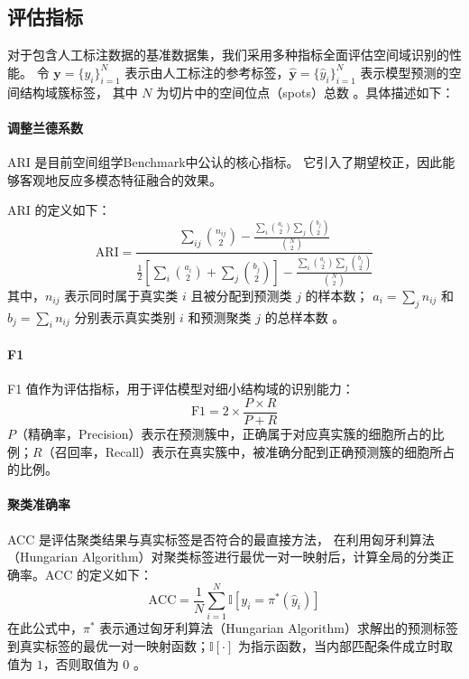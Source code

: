 \documentclass[journal]{IEEEtran}
\begin{document}
\subsection{评估指标}
对于包含人工标注数据的基准数据集，我们采用多种指标全面评估空间域识别的性能。
令 $\mathbf{y}=\{y_i\}_{i=1}^{N}$ 表示由人工标注的参考标签，$\hat{\mathbf{y}}=\{\hat{y}_i\}_{i=1}^{N}$ 表示模型预测的空间结构域簇标签，
其中 $N$ 为切片中的空间位点（spots）总数 。具体描述如下：

\paragraph{调整兰德系数}
ARI 是目前空间组学Benchmark中公认的核心指标。
它引入了期望校正，因此能够客观地反应多模态特征融合的效果。

ARI 的定义如下：
\begin{equation}
\mathrm{ARI}=\frac{\sum_{ij}\binom{n_{ij}}{2}-\frac{\sum_i\binom{a_i}{2}\sum_j\binom{b_j}{2}}{\binom{N}{2}}}{\frac{1}{2}\left[\sum_i\binom{a_i}{2}+\sum_j\binom{b_j}{2}\right]-\frac{\sum_i\binom{a_i}{2}\sum_j\binom{b_j}{2}}{\binom{N}{2}}}
\end{equation}
其中，$n_{ij}$ 表示同时属于真实类 $i$ 且被分配到预测类 $j$ 的样本数；
$a_i = \sum_j n_{ij}$ 和 $b_j = \sum_i n_{ij}$ 分别表示真实类别 $i$ 和预测聚类 $j$ 的总样本数 。

\paragraph{F1}
F1 值作为评估指标，用于评估模型对细小结构域的识别能力：
\begin{equation}
\mathrm{F1}=2\times \frac{P\times R}{P+R}
\end{equation}
$P$（精确率，Precision）表示在预测簇中，正确属于对应真实簇的细胞所占的比例；$R$（召回率，Recall）表示在真实簇中，被准确分配到正确预测簇的细胞所占的比例。
\paragraph{聚类准确率}
ACC 是评估聚类结果与真实标签是否符合的最直接方法，
在利用匈牙利算法（Hungarian Algorithm）对聚类标签进行最优一对一映射后，计算全局的分类正确率。ACC 的定义如下：
\begin{equation}
\mathrm{ACC}=\frac{1}{N}\sum_{i=1}^{N}\mathbb{I}\left[y_i=\pi^{*}(\hat{y}_i)\right]
\end{equation}
在此公式中，$\pi^{*}$ 表示通过匈牙利算法（Hungarian Algorithm）求解出的预测标签到真实标签的最优一对一映射函数；$\mathbb{I}[\cdot]$ 为指示函数，当内部匹配条件成立时取值为 $1$，否则取值为 $0$ 。  
\end{document}
